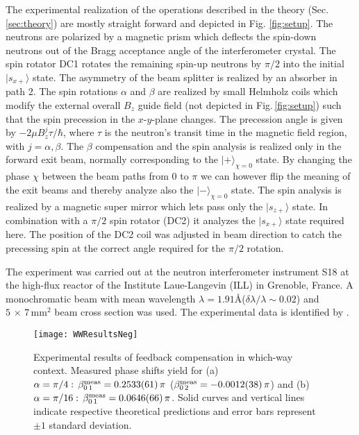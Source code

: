 \documentclass[english,keywords,aps,twocolumn]{revtex4-1}
\begin{document}
The experimental realization of the operations described in the theory (Sec. \ref{sec:theory}) are mostly straight forward and depicted in Fig. \ref{fig:setup}. The neutrons are polarized by a magnetic prism which deflects the spin-down neutrons out of the Bragg acceptance angle of the interferometer crystal. The spin rotator DC1 rotates the remaining spin-up neutrons by $\pi/2$ into the initial $|s_{x+}\rangle$ state. The asymmetry of the beam splitter is realized by an absorber in path 2. The spin rotations $\alpha$ and $\beta$ are realized by small Helmholz coils which modify the external overall $B_z$ guide field (not depicted in Fig.\,\ref{fig:setup}) such that the spin precession in the $x$-$y$-plane changes. The precession angle is given by $-2\mu B^j_z\tau/\hbar$, where $\tau$ is the neutron's transit time in the magnetic field region, with $j=\alpha,\beta$.
The $\beta$ compensation and the spin analysis is realized only in the forward exit beam, normally corresponding to the $|+\rangle_{\chi=0}$ state. By changing the phase $\chi$ between the beam paths from 0 to $\pi$ we can however flip the meaning of the exit beams and thereby analyze also the $|-\rangle_{\chi=0}$ state. The spin analysis is realized by a magnetic super mirror which lets pass only the $|s_{z+}\rangle$ state. In combination with a $\pi /2$ spin rotator (DC2) it analyzes the $|s_{x+}\rangle$ state required here. The position of the DC2 coil was adjusted in beam direction to catch the precessing spin at the correct angle required for the $\pi/2$ rotation.

The experiment was carried out at the neutron interferometer instrument S18 at the high-flux reactor of the Institute Laue-Langevin (ILL) in Grenoble, France. A monochromatic beam with mean wavelength $\lambda=1.91$\AA ($\delta\lambda/\lambda\sim0.02$) and $5\,\times \,7\,\mathrm{mm^{2}}$ beam cross section was used. The experimental data is identified by \cite{S18data}.

%
\begin{figure}[!t]
\texttt{[image: WWResultsNeg]}
	\caption{Experimental results of feedback compensation in which-way context. Measured phase shifts yield for (a) $\alpha=\pi/4:\,\beta_{0\, 1}^{\rm{meas}}=0.2533(61)\,\pi$  ($\beta_{0\, 2}^{\rm{meas}}=-0.0012(38)\,\pi$) and (b)  $\alpha=\pi/16:\,\beta_{0\, 1}^{\rm{meas}}=0.0646(66)\,\pi$. Solid curves and vertical lines indicate respective theoretical predictions and error bars represent $\pm 1$ standard deviation.}\label{fig:WWResults}
	\end{figure}
\end{document}
